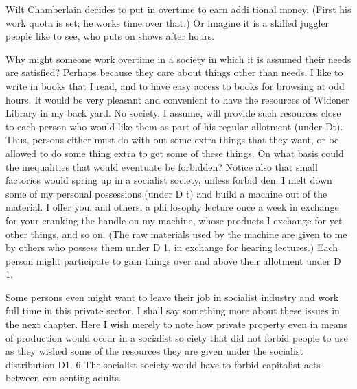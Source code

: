 \documentclass[11pt,openany]{book}
\begin{document}
Wilt Chamberlain decides to put in overtime to earn addi tional money. (First his work quota is set; he works time over that.) Or imagine it is a skilled juggler people like to see, who puts on shows after hours. 

Why might someone work overtime in a society in which it is assumed their needs are satisfied? Perhaps because they care about things other than needs. I like to write in books that I read, and to have easy access to books for browsing at odd hours. It would be very pleasant and convenient to have the resources of Widener Library in my back yard. No society, I assume, will provide such resources close to each person who would like them as part of his regular allotment (under Dt). Thus, persons either must do with out some extra things that they want, or be allowed to do some thing extra to get some of these things. On what basis could the inequalities that would eventuate be forbidden? Notice also that small factories would spring up in a socialist society, unless forbid den. I melt down some of my personal possessions (under D t) and build a machine out of the material. I offer you, and others, a phi losophy lecture once a week in exchange for your cranking the handle on my machine, whose products I exchange for yet other things, and so on. (The raw materials used by the machine are given to me by others who possess them under D 1, in exchange for hearing lectures.) Each person might participate to gain things over and above their allotment under D 1. 

Some persons even might want to leave their job in socialist industry and work full time in this private sector. I shall say something more about these issues in the next chapter. Here I wish merely to note how private property even in means of production would occur in a socialist so ciety that did not forbid people to use as they wished some of the resources they are given under the socialist distribution D1. 6 The socialist society would have to forbid capitalist acts between con senting adults. 
\end{document}
